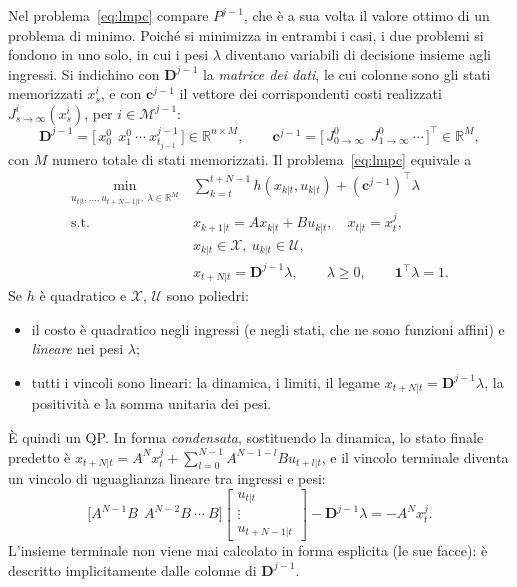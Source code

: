 \documentclass[11pt,a4paper]{article}
\theoremstyle{definition}
\theoremstyle{plain}
\theoremstyle{remark}
\newcommand{\R}{\mathbb{R}}
\newcommand{\Xc}{\mathcal{X}}
\newcommand{\Uc}{\mathcal{U}}
\newcommand{\Mc}{\mathcal{M}}
\newcommand{\vett}[1]{\mathbf{#1}}
\begin{document}
Nel problema~\eqref{eq:lmpc} compare $P^{j-1}$, che è a sua volta il valore
ottimo di un problema di minimo. Poiché si minimizza in entrambi i casi, i due
problemi si fondono in uno solo, in cui i pesi $\lambda$ diventano variabili
di decisione insieme agli ingressi. Si indichino con $\vett{D}^{j-1}$ la
\emph{matrice dei dati}, le cui colonne sono gli stati memorizzati $x^i_s$, e
con $\vett{c}^{j-1}$ il vettore dei corrispondenti costi realizzati
$J^i_{s\to\infty}(x^i_s)$, per $i\in\Mc^{j-1}$:
\[
  \vett{D}^{j-1} = \big[\,x^0_0\ \ x^0_1\ \cdots\ x^{j-1}_{t_{j-1}}\,\big]\in\R^{n\times M},
  \qquad
  \vett{c}^{j-1} = \big[\,J^0_{0\to\infty}\ \ J^0_{1\to\infty}\ \cdots\,\big]^\top\in\R^{M},
\]
con $M$ numero totale di stati memorizzati. Il problema~\eqref{eq:lmpc}
equivale a
\begin{equation}\label{eq:lmpc-unico}
\begin{aligned}
  \min_{u_{t|t},\dots,u_{t+N-1|t},\ \lambda\in\R^M}\ &
  \sum_{k=t}^{t+N-1} h(x_{k|t},u_{k|t}) + (\vett{c}^{j-1})^\top\lambda\\
  \text{s.t. }\ & x_{k+1|t} = Ax_{k|t}+Bu_{k|t},\quad x_{t|t} = x^j_t,\\
  & x_{k|t}\in\Xc,\ u_{k|t}\in\Uc,\\
  & x_{t+N|t} = \vett{D}^{j-1}\lambda,\qquad \lambda\ge 0,\qquad \vett{1}^\top\lambda = 1.
\end{aligned}
\end{equation}
Se $h$ è quadratico e $\Xc$, $\Uc$ sono poliedri:
\begin{itemize}
  \item il costo è quadratico negli ingressi (e negli stati, che ne sono
        funzioni affini) e \emph{lineare} nei pesi $\lambda$;
  \item tutti i vincoli sono lineari: la dinamica, i limiti, il legame
        $x_{t+N|t}=\vett{D}^{j-1}\lambda$, la positività e la somma unitaria
        dei pesi.
\end{itemize}
È quindi un QP. In forma \emph{condensata}, sostituendo la dinamica, lo stato
finale predetto è
$x_{t+N|t}=A^N x^j_t + \sum_{l=0}^{N-1}A^{N-1-l}Bu_{t+l|t}$, e il vincolo
terminale diventa un vincolo di uguaglianza lineare tra ingressi e pesi:
\[
  \big[A^{N-1}B\ \ A^{N-2}B\ \cdots\ B\big]
  \begin{bmatrix}u_{t|t}\\ \vdots\\ u_{t+N-1|t}\end{bmatrix}
  - \vett{D}^{j-1}\lambda = -A^N x^j_t .
\]
L'insieme terminale non viene mai calcolato in forma esplicita (le sue facce):
è descritto implicitamente dalle colonne di $\vett{D}^{j-1}$.
\end{document}
